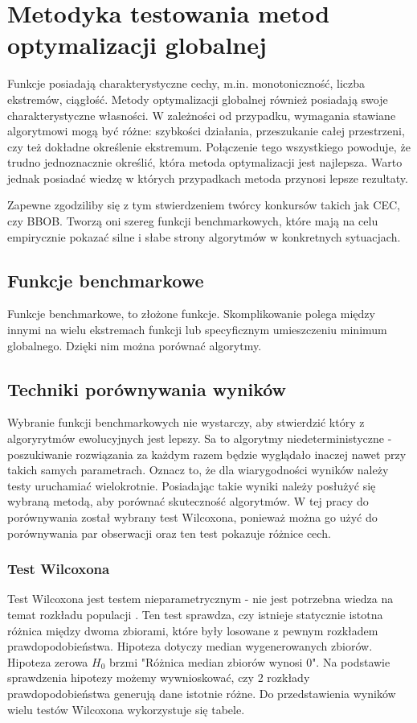\documentclass{mini}
\begin{document}
\pagebreak

\section{Metodyka testowania metod optymalizacji globalnej}
Funkcje posiadają charakterystyczne cechy, m.in. monotoniczność, liczba ekstremów, ciągłość. Metody optymalizacji globalnej również posiadają swoje charakterystyczne własności. W zależności od przypadku, wymagania stawiane algorytmowi mogą być różne: szybkości działania, przeszukanie całej przestrzeni, czy też dokładne określenie ekstremum. Połączenie tego wszystkiego powoduje, że trudno jednoznacznie określić, która metoda optymalizacji jest najlepsza. Warto jednak posiadać wiedzę w których przypadkach metoda przynosi lepsze rezultaty.

Zapewne zgodziliby się z tym stwierdzeniem twórcy konkursów takich jak CEC, czy BBOB. Tworzą oni szereg funkcji benchmarkowych, które mają na celu empirycznie pokazać silne i słabe strony algorytmów w konkretnych sytuacjach.

\subsection{Funkcje benchmarkowe}
Funkcje benchmarkowe, to złożone funkcje. Skomplikowanie polega między innymi na wielu ekstremach funkcji lub specyficznym umieszczeniu minimum globalnego. Dzięki nim można porównać algorytmy.

\subsection{Techniki porównywania wyników}
Wybranie funkcji benchmarkowych nie wystarczy, aby stwierdzić który z algoryrytmów ewolucyjnych jest lepszy. Sa to algorytmy niedeterministyczne - poszukiwanie rozwiązania za każdym razem będzie wyglądało inaczej nawet przy takich samych parametrach. Oznacz to, że dla wiarygodności wyników należy testy uruchamiać wielokrotnie. Posiadając takie wyniki należy posłużyć się wybraną metodą, aby porównać skuteczność algorytmów. W tej pracy do porównywania został wybrany test Wilcoxona, ponieważ można go użyć do porównywania par obserwacji oraz ten test pokazuje różnice cech.

\subsubsection*{Test Wilcoxona}
Test Wilcoxona jest testem nieparametrycznym - nie jest potrzebna wiedza na temat rozkładu populacji \cite{wilcox}. Ten test sprawdza, czy istnieje statycznie istotna różnica między dwoma zbiorami, które były losowane z pewnym rozkładem prawdopodobieństwa. Hipoteza dotyczy median wygenerowanych zbiorów. Hipoteza zerowa $H_0$ brzmi "Różnica median zbiorów wynosi 0". Na podstawie sprawdzenia hipotezy możemy wywnioskować, czy 2 rozkłady prawdopodobieństwa generują dane istotnie różne. Do przedstawienia wyników wielu testów Wilcoxona wykorzystuje się tabele.
\end{document}
